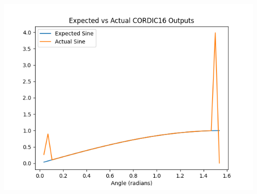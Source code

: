 \documentclass{article}
\begin{document}
\begin{center}
        \includegraphics[scale=.7]{cordic16_sin.png}

    \end{center}
\end{document}

